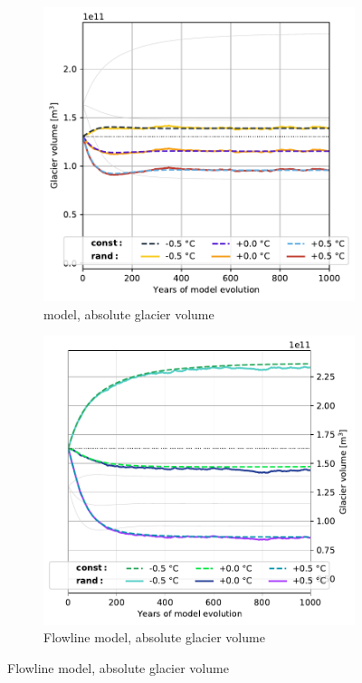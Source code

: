 \begin{figure}[htp]
\begin{subfigure}[b]{0.48\textwidth}
          \end{subfigure}
          \begin{subfigure}[b]{0.48\textwidth}
            \caption{\Vas{} model, absolute glacier volume}
            \label{fig:histalp_commitment:volume_abs_const}
            \centering
            \includegraphics[width=\textwidth]{../plots/final_plots/time_series/histalp_commitment/volume_abs_vas.pdf}
          \end{subfigure}
          \hfill
          \begin{subfigure}[b]{0.48\textwidth}
            \caption{Flowline model, absolute glacier volume}
            \label{fig:histalp_commitment:volume_abs_random}
            \centering
            \includegraphics[width=\textwidth]{../plots/final_plots/time_series/histalp_commitment/volume_abs_fl.pdf}
          \end{subfigure}
          

\end{figure}
